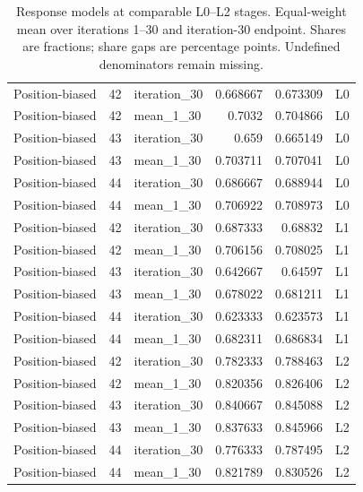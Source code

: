 \begin{table}[htbp!]
\begin{tabular}{lrlrrl}
Position-biased & 42 & iteration\_30 & 0.668667 & 0.673309 & L0 \\
Position-biased & 42 & mean\_1\_30 & 0.7032 & 0.704866 & L0 \\
Position-biased & 43 & iteration\_30 & 0.659 & 0.665149 & L0 \\
Position-biased & 43 & mean\_1\_30 & 0.703711 & 0.707041 & L0 \\
Position-biased & 44 & iteration\_30 & 0.686667 & 0.688944 & L0 \\
Position-biased & 44 & mean\_1\_30 & 0.706922 & 0.708973 & L0 \\
Position-biased & 42 & iteration\_30 & 0.687333 & 0.68832 & L1 \\
Position-biased & 42 & mean\_1\_30 & 0.706156 & 0.708025 & L1 \\
Position-biased & 43 & iteration\_30 & 0.642667 & 0.64597 & L1 \\
Position-biased & 43 & mean\_1\_30 & 0.678022 & 0.681211 & L1 \\
Position-biased & 44 & iteration\_30 & 0.623333 & 0.623573 & L1 \\
Position-biased & 44 & mean\_1\_30 & 0.682311 & 0.686834 & L1 \\
Position-biased & 42 & iteration\_30 & 0.782333 & 0.788463 & L2 \\
Position-biased & 42 & mean\_1\_30 & 0.820356 & 0.826406 & L2 \\
Position-biased & 43 & iteration\_30 & 0.840667 & 0.845088 & L2 \\
Position-biased & 43 & mean\_1\_30 & 0.837633 & 0.845966 & L2 \\
Position-biased & 44 & iteration\_30 & 0.776333 & 0.787495 & L2 \\
Position-biased & 44 & mean\_1\_30 & 0.821789 & 0.830526 & L2 \\
\hline
\end{tabular}
\caption{Response models at comparable L0--L2 stages. Equal-weight mean over iterations 1--30 and iteration-30 endpoint. Shares are fractions; share gaps are percentage points. Undefined denominators remain missing.}
\label{chap:results:tab:rq2_models_exposure}
\end{table}
